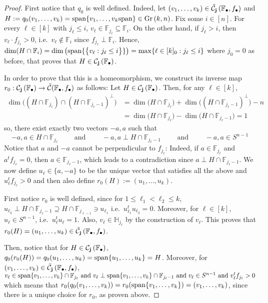 \begin{proof} First notice that $q_0$ is well defined. Indeed, let $(v_1,\ldots,v_k)\in\tilde{\mathcal{C}}_{\mathbf{j}}\left(\mathbb{F}_{\bullet},f_{\bullet}\right)$ and
$H:=q_0(v_1,\ldots,v_k)=\spans\{v_1,\ldots,v_k\spans\}\in\Gr{k}{n}$.
Fix some $i\in[n]$. For every $\ell\in[k]$ with $j_{\ell}\leq i$,  $v_{\ell}\in\mathbb{F}_{j_{\ell}}\subseteq\mathbb{F}_i$. On the other hand, if $j_{\ell}>i$, then $v_{\ell}\cdot f_{j_{\ell}}>0$, i.e.\ $v_{\ell}\not\in\mathbb{F}_i$ since $f_{j_{\ell}}\perp\mathbb{F}_i$. Hence,
$\dim(H\cap\mathbb{F}_i)=\dim\left(\mathrm{span}\{\big\{v_{\ell}:j_{\ell}\leq i\big\}\}\right)=\max\{\ell\in[k]_0:j_{\ell}\leq i\}$
where $j_0=0$ as before, that proves that $H\in\mathcal{C}_{\mathbf{j}}\left(\mathbb{F}_{\bullet}\right)$.

In order to prove that this is a homeomorphism, we construct its inverse map $r_0:\mathcal{C}_{\mathbf{j}}\left(\mathbb{F}_{\bullet}\right)\to\tilde{\mathcal{C}}(\mathbb{F}_{\bullet},f_{\bullet})$ as follows: Let $H\in\mathcal{C}_{\mathbf{j}}\left(\mathbb{F}_{\bullet}\right)$. Then, for any $\ell\in[k]$,
\begin{align*}
\dim\big(\left(H\cap\mathbb{F}_{j_{\ell}}\right)\cap\left(H\cap\mathbb{F}_{j_{\ell}-1}\right)^{\perp}\big)&=\dim\big(H\cap\mathbb{F}_{j_{\ell}}\big)+\dim\big(\left(H\cap\mathbb{F}_{j_{\ell}-1}\right)^{\perp}\big)-n\\
&=\dim\big(H\cap\mathbb{F}_{j_{\ell}}\big)-\dim\big(H\cap\mathbb{F}_{j_{\ell}-1}\big)=1
\end{align*}
so, there exist exactly two vectors $-a,a$ such that
\[-a,a\in H\cap\mathbb{F}_{j_{\ell}}\qquad\text{ and }\qquad-a,a\perp H\cap\mathbb{F}_{j_{\ell}-1}\qquad\text{ and }\qquad-a,a\in S^{n-1}\]
Notice that $a$ and $-a$ cannot be perpendicular to $f_{j_{\ell}}$: Indeed, if $a\in\mathbb{F}_{j_{\ell}}$ and $a^tf_{j_{\ell}}=0$, then $a\in\mathbb{F}_{j_{\ell}-1}$, which leads to a contradiction since $a\perp H\cap\mathbb{F}_{j_{\ell}-1}$. We now define $u_{\ell}\in\{a,-a\}$ to be the unique vector that satisfies all the above and $u_{\ell}^tf_{j_{\ell}}>0$ and then also define $r_0(H):=(u_1,\ldots,u_k)$.

First notice $r_0$ is well defined, since for $1\leq\ell_1<\ell_2\leq k$,
$u_{\ell_2}\perp H\cap\mathbb{F}_{j_{\ell}-1}\supseteq H\cap\mathbb{F}_{j_{\ell-1}}\ni u_{\ell_1}$
i.e.\ $u_{\ell_1}^tu_{\ell_2}=0$. Moreover, for $\ell\in[k]$, $u_{\ell}\in S^{n-1}$, i.e.\ $u_{\ell}^tu_{\ell}=1$. Also, $v_{\ell}\in\mathbb{H}_{j_{\ell}}$ by the construction of $v_{\ell}$. This proves that $r_0(H)=(u_1,\ldots,u_k)\in\tilde{\mathcal{C}}_{\mathbf{j}}\left(\mathbb{F}_{\bullet},f_{\bullet}\right)$.

Then, notice that for $H\in\mathcal{C}_{\mathbf{j}}\left(\mathbb{F}_{\bullet}\right)$,
$q_0(r_0(H))=q_0(u_1,\ldots,u_k)=\mathrm{span}\{u_1,\ldots,u_k\}=H$.
Moreover, for $(v_1,\ldots,v_k)\in\tilde{\mathcal{C}}_{\mathbf{j}}\left(\mathbb{F}_{\bullet},f_{\bullet}\right)$,
$v_{\ell}\in\mathrm{span}\{v_1,\ldots,v_k\}\cap\mathbb{F}_{j_{\ell}}\text{ and } v_{\ell}\perp\mathrm{span}\{v_1,\ldots,v_k\}\cap\mathbb{F}_{j_{\ell}-1}\text{ and }v_{\ell}\in S^{n-1}\text{ and }v_{\ell}^tf_{j_{\ell}}>0$
which means that
$r_0(q_0(v_1,\ldots,v_k))=r_0(\mathrm{span}\{v_1,\ldots,v_k\})=(v_1,\ldots,v_k)$,
since there is a unique choice for $r_0$, as proven above.
\end{proof}

